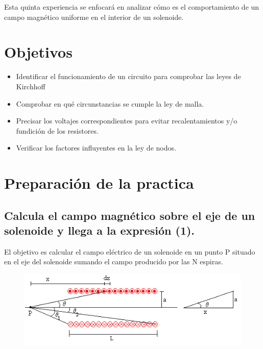 \documentclass[letterpaper, 12pt]{article}
\begin{document}
\begin{multicols}{2}
	Esta quinta experiencia se enfocará en analizar cómo es el comportamiento
	de un campo magnético uniforme en el interior de un solenoide.

	\section{Objetivos}


	\begin{itemize}
		\item Identificar el funcionamiento de un circuito para comprobar las leyes
		      de Kirchhoff
		\item Comprobar en qué circunstancias se cumple la ley de malla.
		\item Precisar los voltajes correspondientes para evitar
		      recalentamientos y/o fundición de los resistores.
		\item Verificar  los factores influyentes en la ley de nodos.
	\end{itemize}

	\section{Preparación de la practica}

	\subsection*{Calcula el campo magnético sobre el eje de un solenoide y llega a la expresión (1).}

	El objetivo es calcular el campo eléctrico de un solenoide en un punto P situado
	en el eje del solenoide sumando el campo producido por las N espiras.

	\begin{figure}[H]
		\includegraphics[width = \linewidth]{./Images/solenoide.png}
	\end{figure}


\end{multicols}
\end{document}
